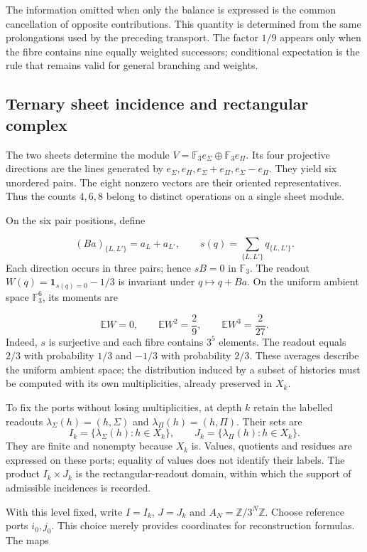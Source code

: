 The information omitted when only the balance is expressed is the common cancellation of opposite contributions. This quantity is determined from the same prolongations used by the preceding transport. The factor \(1/9\) appears only when the fibre contains nine equally weighted successors; conditional expectation is the rule that remains valid for general branching and weights.

\subsection{Ternary sheet incidence and rectangular complex}
\label{iv:cont:incidencia-rectangular}
The two sheets determine the module \(V=\mathbb F_3e_\Sigma\oplus\mathbb F_3e_\Pi\). Its four projective directions are the lines generated by \(e_\Sigma,e_\Pi,e_\Sigma+e_\Pi,e_\Sigma-e_\Pi\). They yield six unordered pairs. The eight nonzero vectors are their oriented representatives. Thus the counts \(4,6,8\) belong to distinct operations on a single sheet module.

On the six pair positions, define

\[
(Ba)_{\{L,L'\}}=a_L+a_{L'},
\qquad
s(q)=\sum_{\{L,L'\}}q_{\{L,L'\}}.
\]
Each direction occurs in three pairs; hence \(sB=0\) in \(\mathbb F_3\). The readout \(W(q)=\mathbf1_{s(q)=0}-1/3\) is invariant under \(q\mapsto q+Ba\). On the uniform ambient space \(\mathbb F_3^6\), its moments are

\[
\mathbb EW=0,\qquad
\mathbb EW^2=\frac29,\qquad
\mathbb EW^3=\frac2{27}.
\]
Indeed, \(s\) is surjective and each fibre contains \(3^5\) elements. The readout equals \(2/3\) with probability \(1/3\) and \(-1/3\) with probability \(2/3\). These averages describe the uniform ambient space; the distribution induced by a subset of histories must be computed with its own multiplicities, already preserved in \(X_k\).

To fix the ports without losing multiplicities, at depth \(k\) retain the labelled readouts \(\lambda_\Sigma(h)=(h,\Sigma)\) and \(\lambda_\Pi(h)=(h,\Pi)\). Their sets are
\[
I_k=\{\lambda_\Sigma(h):h\in X_k\},\qquad
J_k=\{\lambda_\Pi(h):h\in X_k\}.
\]
They are finite and nonempty because \(X_k\) is. Values, quotients and residues are expressed on these ports; equality of values does not identify their labels. The product \(I_k\times J_k\) is the rectangular-readout domain, within which the support of admissible incidences is recorded.

With this level fixed, write \(I=I_k\), \(J=J_k\) and \(A_N=\mathbb Z/3^N\mathbb Z\). Choose reference ports \(i_0,j_0\). This choice merely provides coordinates for reconstruction formulas. The maps

